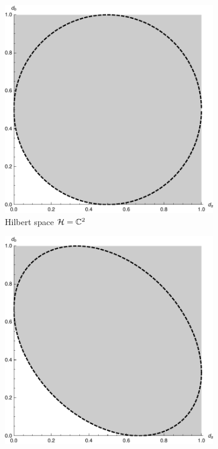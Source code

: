 \begin{figure}
  \centering
  \begin{subfigure}[t]{0.4\textwidth}
    \includegraphics[width=\textwidth]{fourier-ur-2}
    \caption{Hilbert space $\mathcal{H} = \mathbb{C}^2$}
  \end{subfigure}\quad
  \begin{subfigure}[t]{0.4\textwidth}
    \includegraphics[width=\textwidth]{fourier-ur-3}

\end{subfigure}
\end{figure}
